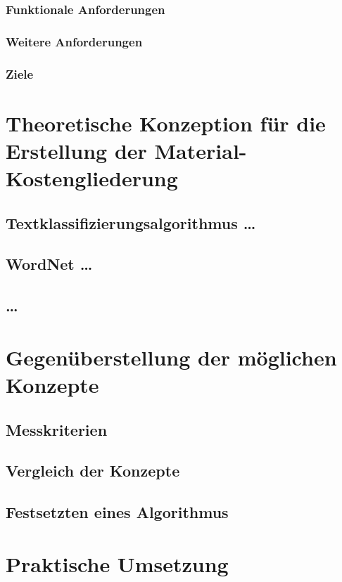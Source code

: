 \subsubsection{Funktionale Anforderungen}
\label{s:requirements:requirements:functional}
\subsubsection{Weitere Anforderungen}
\label{s:requirements:requirements:additional}
\subsubsection{Ziele}
\label{s:requirements:requirements:goals}

\newpage
\section{Theoretische Konzeption für die Erstellung der Material-Kostengliederung}
\subsection{{Textklassifizierungsalgorithmus \dots}}
\subsection{{WordNet \dots}}
\subsection{\dots}

\newpage
\section{Gegenüberstellung der möglichen Konzepte}
\subsection{Messkriterien}
\subsection{Vergleich der Konzepte}
\subsection{Festsetzten eines Algorithmus}

\newpage
\section{Praktische Umsetzung}
